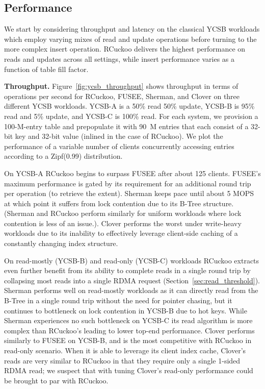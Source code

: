 


\subsection{Performance}

We start by considering throughput and latency on the classical YCSB
workloads which employ varying mixes of read and update operations
before turning to the more complex insert operation.  RCuckoo delivers
the highest performance on reads and updates across all settings,
while insert performance varies as a function of table fill factor.  

\textbf{Throughput.} Figure~\ref{fig:ycsb_throughput} shows throughput in
terms of operations per second for RCuckoo, FUSEE, Sherman, and Clover
on three different YCSB workloads. YCSB-A is a 50\% read 50\% update,
YCSB-B is 95\% read and 5\% update, and YCSB-C is 100\% read.  For
each system, we provision a 100-M-entry table and prepopulate it with
90~M entries that each consist of a 32-bit key and 32-bit value
(inlined in the case of RCuckoo).  We plot the performance of a
variable number of clients concurrently accessing entries according to
a Zipf(0.99) distribution.

On YCSB-A RCuckoo begins to surpass FUSEE after about 125 clients.  FUSEE's maximum performance is gated by its requirement for an additional round trip per operation (to
retrieve the extent). Sherman keeps pace until about 5 MOPS at which
point it suffers from lock contention due to its B-Tree structure.
(Sherman and RCuckoo perform similarly for uniform workloads where
lock contention is less of an issue.).  Clover performs the worst
under write-heavy workloads due to its inability to effectively leverage
client-side caching of a constantly changing index structure.

On read-mostly (YCSB-B) and read-only (YCSB-C) workloads RCuckoo
extracts even further benefit from its ability to complete
reads in a single round trip by collapsing most reads into a single
RDMA request (Section~\ref{sec:read_threshold}).  Sherman performs
well on read-mostly workloads as it can directly read from the B-Tree
in a single round trip without the need for pointer chasing, but it
continues to bottleneck on lock contention in YCSB-B due to hot
keys. While Sherman experiences no such bottleneck on YCSB-C its read
algorithm is more complex than RCuckoo's leading to lower top-end
performance. Clover performs similarly to FUSEE on YCSB-B, and is the
most competitive with RCuckoo in read-only scenario.  When it is able
to leverage its client index cache, Clover's reads are very similar to
RCuckoo in that they require only a single 1-sided RDMA read; we
suspect that with tuning Clover's read-only performance could be
brought to par with RCuckoo.

